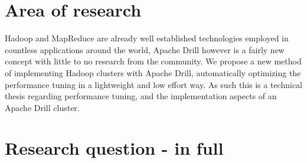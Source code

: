 \documentclass[a4paper,english]{report}
\begin{document}
		\section{Area of research}
		Hadoop and MapReduce are already well established technologies employed in countless applications around the world, Apache Drill however is a fairly new concept with little to no research from the community. We propose a new method of implementing Hadoop clusters with Apache Drill, automatically optimizing the performance tuning in a lightweight and low effort way. As such this is a technical thesis regarding performance tuning, and the implementation aspects of an Apache Drill cluster.
		
		\section{Research question - in full}
\end{document}
